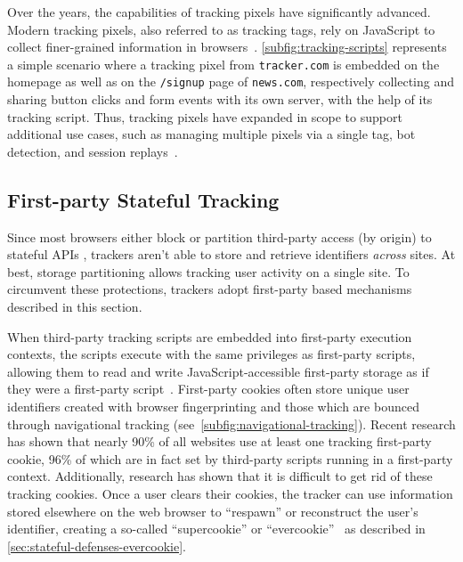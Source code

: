 Over the years, the capabilities of tracking pixels have significantly advanced.
%
Modern tracking pixels, also referred to as tracking tags, rely on JavaScript to collect finer-grained information in browsers~\cite{bekosHitchhikersGuideFacebook2023}. 
%
\autoref{subfig:tracking-scripts} represents a simple scenario where a tracking pixel from \texttt{tracker.com} is embedded on the homepage as well as on the \texttt{/signup} page of \texttt{news.com}, respectively collecting and sharing button clicks and form events with its own server, with the help of its tracking script.
%
Thus, tracking pixels have expanded in scope to support additional use cases, such as managing multiple pixels via a single tag, bot detection, and session replays~\cite{senolLeakyFormsStudy2022,acarNoBoundariesData2020,englehardtNoBoundariesCredentials2018}.




\subsection{First-party Stateful Tracking}
\label{sec:fp-stateful}


Since most browsers either block \cite{TrackingPreventionWebKit2020} or partition third-party access (by origin) to stateful APIs \cite{mdnThirdpartyCookiesPrivacy2024}, trackers aren’t able to store and retrieve identifiers \textit{across} sites. 
%
At best, storage partitioning allows tracking user activity on a single site.
%
To circumvent these protections, trackers adopt first-party based mechanisms described in this section.


\label{subsubsec:stateful-tracking-cookies}
When third-party tracking scripts are embedded into first-party execution contexts, the scripts execute with the same privileges as first-party scripts, allowing them to read and write JavaScript-accessible first-party storage as if they were a first-party script~\cite{bahramiCOOKIEGUARDCharacterizingIsolating2024}. 
%
First-party cookies often store unique user identifiers created with browser fingerprinting and those which are bounced through navigational tracking (see~\autoref{subfig:navigational-tracking}). 
%
Recent research \cite{munirCookieGraphUnderstandingDetecting2023,vekaria2024WebAlmanac2024} has shown that nearly 90\% of all websites use at least one tracking first-party cookie, 96\% of which are in fact set by third-party scripts running in a first-party context.
% 
Additionally, research has shown that it is difficult to get rid of these tracking cookies.
%
Once a user clears their cookies, the tracker can use information stored elsewhere on the web browser to ``respawn'' or reconstruct the user’s identifier, creating a so-called ``supercookie'' or ``evercookie''~\cite{ayensonFlashCookiesPrivacy2011,soltaniFlashCookiesPrivacy2009,fouadMyCookiePhoenix2022} as described in \autoref{sec:stateful-defenses-evercookie}.


